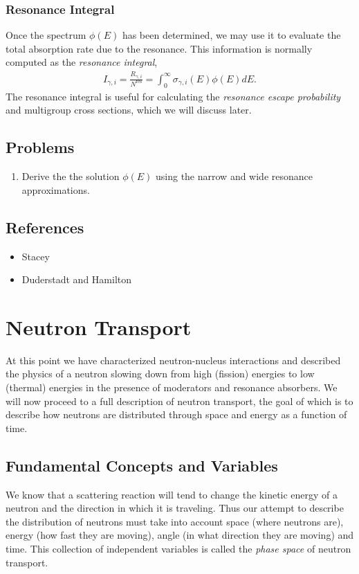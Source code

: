\documentclass[11pt]{article}
\begin{document}
\subsubsection{Resonance Integral}
\label{sec:orgheadline39}
Once the spectrum \(\phi(E)\) has been determined, we may use it to evaluate the total absorption rate due to the resonance.  This information is normally computed as the \emph{resonance integral},
\begin{align}
  I_{\gamma,i} = \frac{R_{\gamma,i}}{N^\text{res}} = \int_0^\infty \sigma_{\gamma,i}(E) \phi(E) dE.
\end{align}
The resonance integral is useful for calculating the \emph{resonance escape probability} and multigroup cross sections, which we will discuss later.
\subsection{Problems}
\label{sec:orgheadline41}
\begin{enumerate}
\item Derive the the solution \(\phi(E)\) using the narrow and wide resonance approximations.
\end{enumerate}
\subsection{References}
\label{sec:orgheadline42}
\begin{itemize}
\item Stacey
\item Duderstadt and Hamilton
\end{itemize}
\section{Neutron Transport}
\label{sec:orgheadline57}
At this point we have characterized neutron-nucleus interactions and described the physics of a neutron slowing down from high (fission) energies to low (thermal) energies in the presence of moderators and resonance absorbers.  We will now proceed to a full description of neutron transport, the goal of which is to describe how neutrons are distributed through space and energy as a function of time.

\subsection{Fundamental Concepts and Variables}
\label{sec:orgheadline47}
We know that a scattering reaction will tend to change the kinetic energy of a neutron and the direction in which it is traveling.  Thus our attempt to describe the distribution of neutrons must take into account space (where neutrons are), energy (how fast they are moving), angle (in what direction they are moving) and time.  This collection of independent variables is called the \emph{phase space} of neutron transport.
\end{document}
